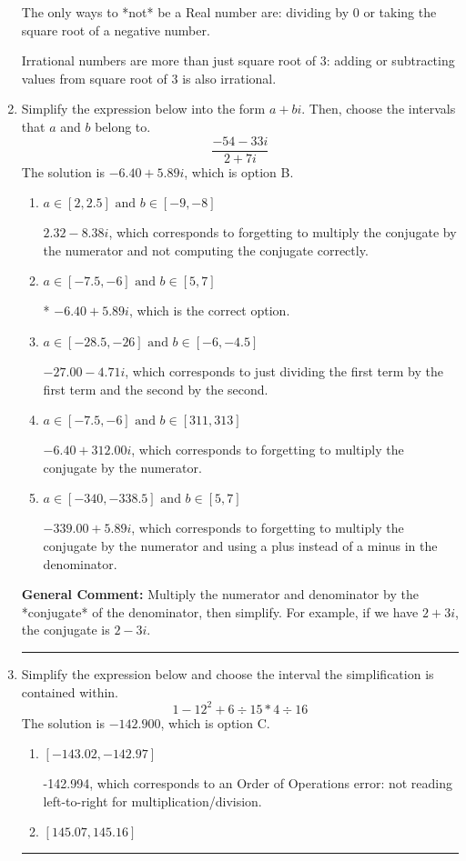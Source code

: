 \documentclass{extbook}[14pt]
\newcommand{\litem}[1]{\item #1

\rule{\textwidth}{0.4pt}}
\begin{document}
\begin{enumerate}
{ The only ways to *not* be a Real number are: dividing by 0 or taking the square root of a negative number. 
 
 Irrational numbers are more than just square root of 3: adding or subtracting values from square root of 3 is also irrational.
}
\litem{
Simplify the expression below into the form $a+bi$. Then, choose the intervals that $a$ and $b$ belong to.
\[ \frac{-54 - 33 i}{2 + 7 i} \]The solution is \( -6.40  + 5.89 i \), which is option B.\begin{enumerate}[label=\Alph*.]
\item \( a \in [2, 2.5] \text{ and } b \in [-9, -8] \)

 $2.32  - 8.38 i$, which corresponds to forgetting to multiply the conjugate by the numerator and not computing the conjugate correctly.
\item \( a \in [-7.5, -6] \text{ and } b \in [5, 7] \)

* $-6.40  + 5.89 i$, which is the correct option.
\item \( a \in [-28.5, -26] \text{ and } b \in [-6, -4.5] \)

 $-27.00  - 4.71 i$, which corresponds to just dividing the first term by the first term and the second by the second.
\item \( a \in [-7.5, -6] \text{ and } b \in [311, 313] \)

 $-6.40  + 312.00 i$, which corresponds to forgetting to multiply the conjugate by the numerator.
\item \( a \in [-340, -338.5] \text{ and } b \in [5, 7] \)

 $-339.00  + 5.89 i$, which corresponds to forgetting to multiply the conjugate by the numerator and using a plus instead of a minus in the denominator.
\end{enumerate}

\textbf{General Comment:} Multiply the numerator and denominator by the *conjugate* of the denominator, then simplify. For example, if we have $2+3i$, the conjugate is $2-3i$.
}
\litem{
Simplify the expression below and choose the interval the simplification is contained within.
\[ 1 - 12^2 + 6 \div 15 * 4 \div 16 \]The solution is \( -142.900 \), which is option C.\begin{enumerate}[label=\Alph*.]
\item \( [-143.02, -142.97] \)

 -142.994, which corresponds to an Order of Operations error: not reading left-to-right for multiplication/division.
\item \( [145.07, 145.16] \)


\end{enumerate}}
\end{enumerate}
\end{document}
